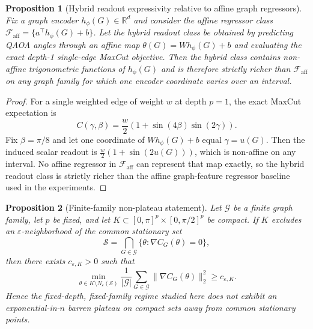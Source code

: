 \documentclass[
  reprint,
  twocolumn,
  aps,
  superscriptaddress,
  longbibliography,
  floatfix
]{revtex4-2}
\newtheorem{proposition}{Proposition}
\begin{document}
\begin{proposition}[Hybrid readout expressivity relative to affine graph regressors]
Fix a graph encoder $h_\phi(G) \in \mathbb{R}^d$ and consider the affine regressor class $\mathcal{F}_{\mathrm{aff}} = \{a^\top h_\phi(G)+b\}$. Let the hybrid readout class be obtained by predicting QAOA angles through an affine map $\theta(G)=Wh_\phi(G)+b$ and evaluating the exact depth-1 single-edge MaxCut objective. Then the hybrid class contains non-affine trigonometric functions of $h_\phi(G)$ and is therefore strictly richer than $\mathcal{F}_{\mathrm{aff}}$ on any graph family for which one encoder coordinate varies over an interval.
\end{proposition}

\begin{proof}
For a single weighted edge of weight $w$ at depth $p=1$, the exact MaxCut expectation is
\begin{equation}
C(\gamma,\beta) = \frac{w}{2}\left(1+\sin(4\beta)\sin(2\gamma)\right).
\end{equation}
Fix $\beta=\pi/8$ and let one coordinate of $Wh_\phi(G)+b$ equal $\gamma=u(G)$. Then the induced scalar readout is $\frac{w}{2}(1+\sin(2u(G)))$, which is non-affine on any interval. No affine regressor in $\mathcal{F}_{\mathrm{aff}}$ can represent that map exactly, so the hybrid readout class is strictly richer than the affine graph-feature regressor baseline used in the experiments.
\end{proof}

\begin{proposition}[Finite-family non-plateau statement]
Let $\mathcal{G}$ be a finite graph family, let $p$ be fixed, and let $K \subset [0,\pi]^p \times [0,\pi/2]^p$ be compact. If $K$ excludes an $\varepsilon$-neighborhood of the common stationary set
\begin{equation}
\mathcal{S} = \bigcap_{G \in \mathcal{G}} \{\theta : \nabla C_G(\theta)=0\},
\end{equation}
then there exists $c_{\varepsilon,K}>0$ such that
\begin{equation}
\min_{\theta \in K \setminus N_\varepsilon(\mathcal{S})} \frac{1}{|\mathcal{G}|}\sum_{G \in \mathcal{G}} \|\nabla C_G(\theta)\|_2^2 \geq c_{\varepsilon,K}.
\end{equation}
Hence the fixed-depth, fixed-family regime studied here does not exhibit an exponential-in-$n$ barren plateau on compact sets away from common stationary points.
\end{proposition}
\end{document}
